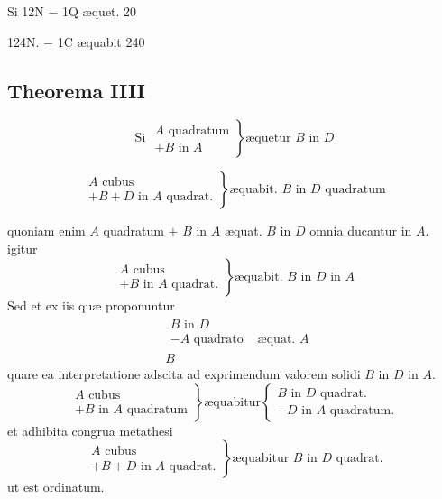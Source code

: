 \documentclass[11pt,a4paper]{article}
\begin{document}
Si 12N $-$ 1Q æquet. 20

124N. $-$ 1C æquabit 240

\subsection*{Theorema IIII}

\[ \text{Si } \left.\begin{array}{l} A \text{ quadratum} \\ + B \text{ in } A \end{array}\right\} \text{æquetur } B \text{ in } D \]

\[ \left.\begin{array}{l} A \text{ cubus} \\ + B + D \text{ in } A \text{ quadrat.} \end{array}\right\} \text{æquabit. } B \text{ in } D \text{ quadratum} \]

quoniam enim $A$ quadratum $+$ $B$ in $A$ æquat. $B$ in $D$ omnia ducantur in $A$. igitur
\[ \left.\begin{array}{l} A \text{ cubus} \\ + B \text{ in } A \text{ quadrat.} \end{array}\right\} \text{æquabit. } B \text{ in } D \text{ in } A \]
Sed et ex iis quæ proponuntur
\[ \begin{array}{c} \begin{array}{l} B \text{ in } D \\ - A \text{ quadrato} \end{array} \\ \hline B \end{array} \text{ æquat. } A \]
quare ea interpretatione adscita ad exprimendum valorem solidi $B$ in $D$ in $A$.
\[ \left.\begin{array}{l} A \text{ cubus} \\ + B \text{ in } A \text{ quadratum} \end{array}\right\} \text{æquabitur} \left\{\begin{array}{l} B \text{ in } D \text{ quadrat.} \\ - D \text{ in } A \text{ quadratum.} \end{array}\right. \]
et adhibita congrua metathesi
\[ \left.\begin{array}{l} A \text{ cubus} \\ + B + D \text{ in } A \text{ quadrat.} \end{array}\right\} \text{æquabitur } B \text{ in } D \text{ quadrat.} \]
ut est ordinatum.
\end{document}
